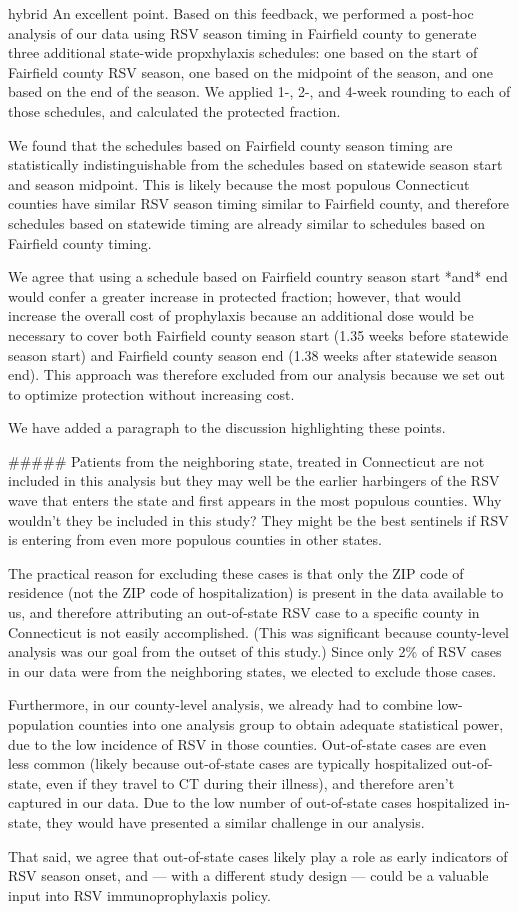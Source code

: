 \documentclass{article}
\begin{document}
\begin{markdown*}{hybrid}
An excellent point. Based on this feedback, we performed a post-hoc analysis of our data using RSV season timing in Fairfield county to generate three additional state-wide propxhylaxis schedules: one based on the start of Fairfield county RSV season, one based on the midpoint of the season, and one based on the end of the season. We applied 1-, 2-, and 4-week rounding to each of those schedules, and calculated the protected fraction.

We found that the schedules based on Fairfield county season timing are statistically indistinguishable from the schedules based on statewide season start and season midpoint. This is likely because the most populous Connecticut counties have similar RSV season timing similar to Fairfield county, and therefore schedules based on statewide timing are already similar to schedules based on Fairfield county timing. 

We agree that using a schedule based on Fairfield country season start *and* end would confer a greater increase in protected fraction; however, that would increase the overall cost of prophylaxis because an additional dose would be necessary to cover both Fairfield county season start (1.35 weeks before statewide season start) and Fairfield county season end (1.38 weeks after statewide season end). This approach was therefore excluded from our analysis because we set out to optimize protection without increasing cost. 

We have added a paragraph to the discussion highlighting these points. 

##### Patients from the neighboring state, treated in Connecticut are not included in this analysis but they may well be the earlier harbingers of the RSV wave that enters the state and first appears in the most populous counties. Why wouldn’t they be included in this study? They might be the best sentinels if RSV is entering from even more populous counties in other states.

The practical reason for excluding these cases is that only the ZIP code of residence (not the ZIP code of hospitalization) is present in the data available to us, and therefore attributing an out-of-state RSV case to a specific county in Connecticut is not easily accomplished. (This was significant because county-level analysis was our goal from the outset of this study.) Since only 2\% of RSV cases in our data were from the neighboring states, we elected to exclude those cases. 

Furthermore, in our county-level analysis, we already had to combine low-population counties into one analysis group to obtain adequate statistical power, due to the low incidence of RSV in those counties. Out-of-state cases are even less common (likely because out-of-state cases are typically hospitalized out-of-state, even if they travel to CT during their illness), and therefore aren't captured in our data. Due to the low number of out-of-state cases hospitalized in-state, they would have presented a similar challenge in our analysis. 

That said, we agree that out-of-state cases likely play a role as early indicators of RSV season onset, and — with a different study design — could be a valuable input into RSV immunoprophylaxis policy. 

\end{markdown*}
\end{document}

